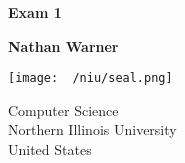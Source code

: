 \documentclass{report}
\title{\Huge{}}
\author{\huge{Nathan Warner}}
\date{\huge{}}
\begin{document}
        \begin{titlepage}
       \begin{center}
           \vspace*{1cm}
    
           \textbf{Exam 1}
    
           \vspace{0.5cm}
            
                
           \vspace{1.5cm}
    
           \textbf{Nathan Warner}
    
           \vfill
                
                
           \vspace{0.8cm}
         
           \texttt{[image: ~/niu/seal.png]}
                
           Computer Science \\
           Northern Illinois University\\
           United States\\
           
                
       \end{center}
    \end{titlepage}
    \tableofcontents
    \bigbreak \noindent 
\end{document}
